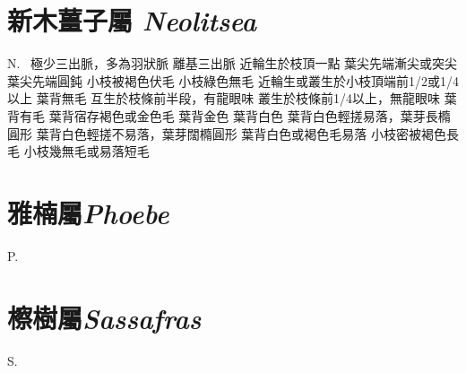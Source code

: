 \documentclass[12pt,a4paper]{article}
\begin{document}
\section{新木薑子屬 \textit{Neolitsea}}
\begin{Key*}{N.~}
\indent\alter 極少三出脈，多為羽狀脈
\alter 離基三出脈
    \alter 近輪生於枝頂一點
        \alter 葉尖先端漸尖或突尖
        \alter 葉尖先端圓鈍
            \alter 小枝被褐色伏毛
            \alter 小枝綠色無毛
    \alter 近輪生或叢生於小枝頂端前1/2或1/4以上
        \alter 葉背無毛
            \alter 互生於枝條前半段，有龍眼味
            \alter 叢生於枝條前1/4以上，無龍眼味
        \alter 葉背有毛
            \alter 葉背宿存褐色或金色毛
                \alter 葉背金色
                \alter 葉背白色
                    \alter 葉背白色輕搓易落，葉芽長橢圓形
                    \alter 葉背白色輕搓不易落，葉芽闊橢圓形
            \alter 葉背白色或褐色毛易落
                \alter 小枝密被褐色長毛
                \alter 小枝幾無毛或易落短毛

\end{Key*}


\section{雅楠屬\textit{Phoebe}}
\begin{Key*}{P.~}
\indent\alter
{}
\end{Key*}


\section{檫樹屬\textit{Sassafras}}
\begin{Key*}{S.~}
\indent\alter
{}
\end{Key*}

\begin{comment}
\begin{Key*}{A.~}
\indent\alter
\cname{前面}{\var B}
\alter
\cname{front}{\f B}
\end{Key*}
\end{comment}
\end{document}
